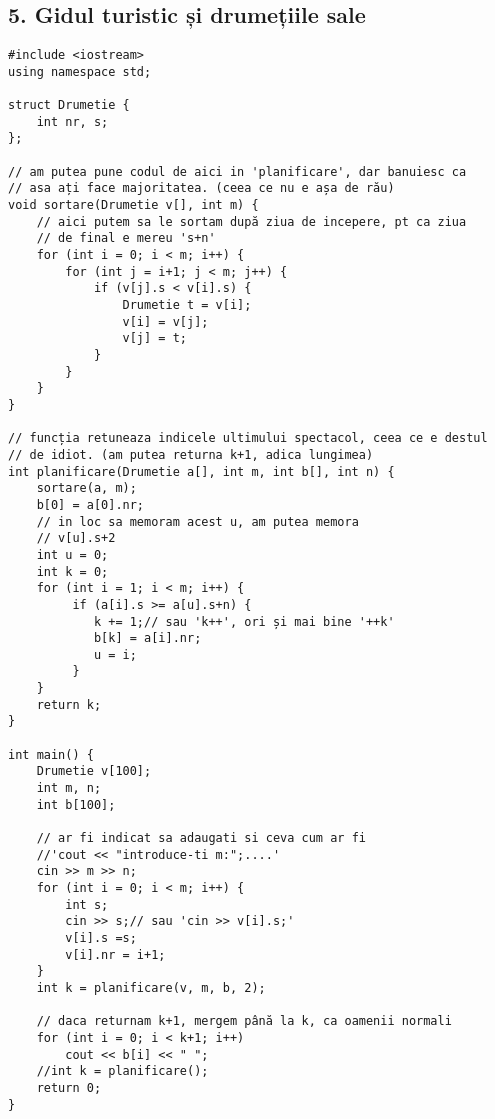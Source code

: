 \documentclass[11pt]{article}
\begin{document}
\subsection*{5. Gidul turistic și drumețiile sale}
\label{sec:org86313fa}
\begin{verbatim}
#include <iostream>
using namespace std;

struct Drumetie {
    int nr, s;
};

// am putea pune codul de aici in 'planificare', dar banuiesc ca
// asa ați face majoritatea. (ceea ce nu e așa de rău)
void sortare(Drumetie v[], int m) {
    // aici putem sa le sortam după ziua de incepere, pt ca ziua
    // de final e mereu 's+n'
    for (int i = 0; i < m; i++) {
        for (int j = i+1; j < m; j++) {
            if (v[j].s < v[i].s) {
                Drumetie t = v[i];
                v[i] = v[j];
                v[j] = t;
            }
        }
    }
}

// funcția retuneaza indicele ultimului spectacol, ceea ce e destul
// de idiot. (am putea returna k+1, adica lungimea)
int planificare(Drumetie a[], int m, int b[], int n) {
    sortare(a, m);
    b[0] = a[0].nr;
    // in loc sa memoram acest u, am putea memora
    // v[u].s+2
    int u = 0;
    int k = 0;
    for (int i = 1; i < m; i++) {
         if (a[i].s >= a[u].s+n) {
            k += 1;// sau 'k++', ori și mai bine '++k'
            b[k] = a[i].nr;
            u = i;
         }
    }
    return k;
}

int main() {
    Drumetie v[100];
    int m, n;
    int b[100];

    // ar fi indicat sa adaugati si ceva cum ar fi
    //'cout << "introduce-ti m:";....'
    cin >> m >> n;
    for (int i = 0; i < m; i++) {
        int s;
        cin >> s;// sau 'cin >> v[i].s;'
        v[i].s =s;
        v[i].nr = i+1;
    }
    int k = planificare(v, m, b, 2);

    // daca returnam k+1, mergem până la k, ca oamenii normali
    for (int i = 0; i < k+1; i++)
        cout << b[i] << " ";
    //int k = planificare();
    return 0;
}

\end{verbatim}
\end{document}
